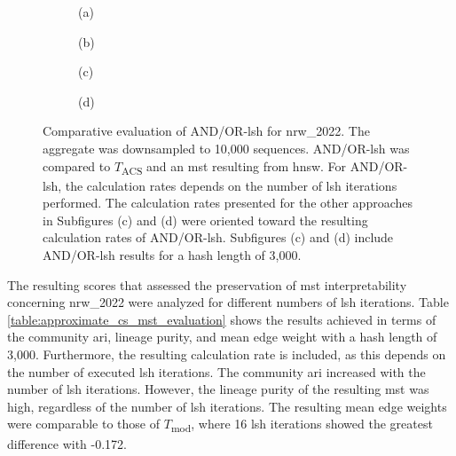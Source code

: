 \begin{figure}[H]
  \centering
  \begin{subfigure}[b]{0.47\textwidth}
    
    \caption*{(a)}
  \end{subfigure}
  \hfill
  \begin{subfigure}[b]{0.47\textwidth}
    
    \caption*{(b)}
  \end{subfigure}
    \begin{subfigure}[b]{0.47\textwidth}
    
    \caption*{(c)}
  \end{subfigure}
  \hfill
  \begin{subfigure}[b]{0.47\textwidth}
    
    \caption*{(d)}
  \end{subfigure}
  \caption[Comparative evaluation of AND/OR-\acrshort{lsh} for nrw\_2022]{Comparative evaluation of AND/OR-\acrshort{lsh} for nrw\_2022. The aggregate was downsampled to 10,000 sequences. AND/OR-\acrshort{lsh} was compared to $T$\textsubscript{ACS} and an \acrshort{mst} resulting from \acrshort{hnsw}. For AND/OR-\acrshort{lsh}, the calculation rates depends on the number of \acrshort{lsh} iterations performed. The calculation rates presented for the other approaches in Subfigures (c) and (d) were oriented toward the resulting calculation rates of AND/OR-\acrshort{lsh}. Subfigures (c) and (d) include AND/OR-\acrshort{lsh} results for a hash length of 3,000.}
  \label{fig:approximate_cs_nrw_2022}
\end{figure}

The resulting scores that assessed the preservation of \acrshort{mst} interpretability concerning nrw\_2022 were analyzed for different numbers of \acrshort{lsh} iterations. Table \ref{table:approximate_cs_mst_evaluation} shows the results achieved in terms of the community \acrshort{ari}, lineage purity, and mean edge weight with a hash length of 3,000. Furthermore, the resulting calculation rate is included, as this depends on the number of executed \acrshort{lsh} iterations. The community \acrshort{ari} increased with the number of \acrshort{lsh} iterations. However, the lineage purity of the resulting \acrshort{mst} was high, regardless of the number of \acrshort{lsh} iterations. The resulting mean edge weights were comparable to those of $T$\textsubscript{mod}, where 16 \acrshort{lsh} iterations showed the greatest difference with -0.172.


